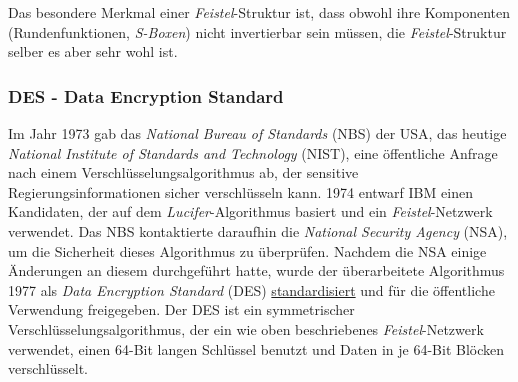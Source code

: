 
Das besondere Merkmal einer \textit{Feistel}-Struktur ist, dass obwohl ihre Komponenten (Rundenfunktionen, \textit{S-Boxen}) nicht invertierbar sein müssen, die \textit{Feistel}-Struktur selber es aber sehr wohl ist.

\subsubsection{DES - Data Encryption Standard}
\label{sssec:des}

Im Jahr 1973 gab das \textit{National Bureau of Standards} (NBS) der USA, das heutige \textit{National Institute of Standards and Technology} (NIST), eine öffentliche Anfrage nach einem Verschlüsselungsalgorithmus ab, der sensitive Regierungsinformationen sicher verschlüsseln kann. 1974 entwarf IBM einen Kandidaten, der auf dem \textit{Lucifer}-Algorithmus basiert und ein \textit{Feistel}-Netzwerk verwendet. Das NBS kontaktierte daraufhin die \textit{National Security Agency} (NSA), um die Sicherheit dieses Algorithmus zu überprüfen. Nachdem die NSA einige Änderungen an diesem durchgeführt hatte, wurde der überarbeitete Algorithmus 1977 als \textit{Data Encryption Standard} (DES) \href{http://csrc.nist.gov/publications/fips/archive/fips46-3/fips46-3.pdf}{standardisiert} und für die öffentliche Verwendung freigegeben. Der DES ist ein symmetrischer Verschlüsselungsalgorithmus, der ein wie oben beschriebenes \textit{Feistel}-Netzwerk verwendet, einen 64-Bit langen Schlüssel benutzt und Daten in je 64-Bit Blöcken verschlüsselt. 

